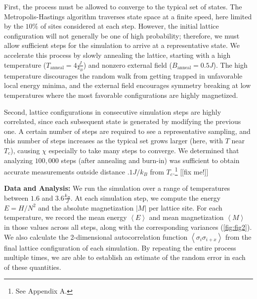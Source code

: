 \documentclass[letter,scriptaddress,twocolumn, prl,nofootinbib]{revtex4}
\newcommand{\submin}[1]{\left\langle #1 \right\rangle}
\begin{document}
First, the process must be allowed to converge to the typical set of states. The Metropolis-Hastings algorithm traverses state space at a finite speed, here limited by the $10\%$ of sites considered at each step. However, the initial lattice configuration will not generally be one of high probability; therefore, we must allow sufficient steps for the simulation to arrive at a representative state. We accelerate this process by slowly annealing the lattice, starting with a high temperature ($T_\text{anneal} = 4 \frac{J}{k_B}$) and nonzero external field ($B_\text{anneal} = 0.5 J$). The high temperature discourages the random walk from getting trapped in unfavorable local energy minima, and the external field encourages symmetry breaking at low temperatures where the most favorable configurations are highly magnetized.

Second, lattice configurations in consecutive simulation steps are highly correlated, since each subsequent state is generated by modifying the previous one. A certain number of steps are required to see a representative sampling, and this number of steps increases as the typical set grows larger (here, with $T$ near $T_c$), causing $\chi$ especially to take many steps to converge. We determined that analyzing $100,000$ steps (after annealing and burn-in) was sufficient to obtain accurate measurements outside distance $.1 J/k_B$ from $T_c$.\footnote{See Appendix A.} [[fix me!]]

\textbf{Data and Analysis:} We run the simulation over a range of temperatures between $1.6$ and $3.6\frac{k_B}{J}$. At each simulation step, we compute the energy $E = H / N^2$ and the absolute magnetization $|M|$ per lattice site. For each temperature, we record the mean energy $\submin{E}$ and mean magnetization $\submin{M}$ in those values across all steps, along with the corresponding variances (\autoref{fig:fig2}). We also calculate the 2-dimensional autocorrelation function $\submin{\sigma_i\sigma_{i + x}}$ from the final lattice configuration of each simulation. By repeating the entire process multiple times, we are able to establish an estimate of the random error in each of these quantities. 
\end{document}
